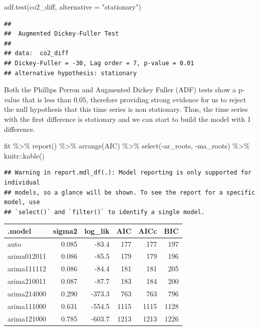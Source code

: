 \documentclass[AER]{AEA}
\newenvironment{Shaded}{\begin{snugshade}}{\end{snugshade}}
\newcommand{\AttributeTok}[1]{\textcolor[rgb]{0.77,0.63,0.00}{#1}}
\newcommand{\FunctionTok}[1]{\textcolor[rgb]{0.00,0.00,0.00}{#1}}
\newcommand{\NormalTok}[1]{#1}
\newcommand{\SpecialCharTok}[1]{\textcolor[rgb]{0.00,0.00,0.00}{#1}}
\newcommand{\StringTok}[1]{\textcolor[rgb]{0.31,0.60,0.02}{#1}}
\begin{document}
\begin{Shaded}
\begin{Highlighting}[]
\FunctionTok{adf.test}\NormalTok{(co2\_diff, }\AttributeTok{alternative =} \StringTok{"stationary"}\NormalTok{)}
\end{Highlighting}
\end{Shaded}

\begin{verbatim}
## 
##  Augmented Dickey-Fuller Test
## 
## data:  co2_diff
## Dickey-Fuller = -30, Lag order = 7, p-value = 0.01
## alternative hypothesis: stationary
\end{verbatim}

Both the Phillips Perron and Augmented Dickey Fuller (ADF) tests show a
p-value that is less than \(0.05\), therefore providing strong evidence
for us to reject the null hypothesis that this time series is non
stationary. Thus, the time series with the first difference is
stationary and we can start to build the model with 1 difference.

\begin{Shaded}
\begin{Highlighting}[]
\NormalTok{fit }\SpecialCharTok{\%\textgreater{}\%}
  \FunctionTok{report}\NormalTok{() }\SpecialCharTok{\%\textgreater{}\%} \FunctionTok{arrange}\NormalTok{(AIC) }\SpecialCharTok{\%\textgreater{}\%} 
  \FunctionTok{select}\NormalTok{(}\SpecialCharTok{{-}}\NormalTok{ar\_roots, }\SpecialCharTok{{-}}\NormalTok{ma\_roots) }\SpecialCharTok{\%\textgreater{}\%}\NormalTok{ knitr}\SpecialCharTok{::}\FunctionTok{kable}\NormalTok{()}
\end{Highlighting}
\end{Shaded}

\begin{verbatim}
## Warning in report.mdl_df(.): Model reporting is only supported for individual
## models, so a glance will be shown. To see the report for a specific model, use
## `select()` and `filter()` to identify a single model.
\end{verbatim}

\begin{longtable}[]{@{}lrrrrr@{}}
\toprule
.model & sigma2 & log\_lik & AIC & AICc & BIC \\
\midrule
\endhead
auto & 0.085 & -83.4 & 177 & 177 & 197 \\
arima012011 & 0.086 & -85.5 & 179 & 179 & 196 \\
arima111112 & 0.086 & -84.4 & 181 & 181 & 205 \\
arima210011 & 0.087 & -87.7 & 183 & 184 & 200 \\
arima214000 & 0.290 & -373.3 & 763 & 763 & 796 \\
arima111000 & 0.631 & -554.5 & 1115 & 1115 & 1128 \\
arima121000 & 0.785 & -603.7 & 1213 & 1213 & 1226 \\
\bottomrule
\end{longtable}
\end{document}

